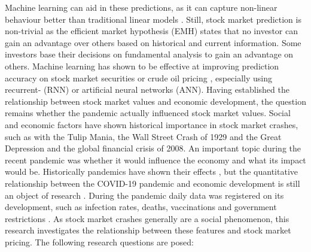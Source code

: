 Machine learning can aid in these predictions, as it can capture non-linear behaviour better than traditional linear models \cite{zhang2009stock}. Still, stock market prediction is non-trivial as the efficient market hypothesis (EMH) \cite{peters1996chaos} states that no investor can gain an advantage over others based on historical and current information. Some investors base their decisions on fundamental analysis \cite{lev1993fundamental} to gain an advantage on others. Machine learning has shown to be effective at improving prediction accuracy on stock market securities or crude oil pricing \cite{jain1996, YU20082623, zhang2009stock, thawornwong2004forecasting}, especially using recurrent- (RNN) or artificial neural networks (ANN). %
Having established the relationship between stock market values and economic development, the question remains whether the pandemic actually influenced stock market values. Social and economic factors have shown historical importance in stock market crashes, such as with the Tulip Mania, the Wall Street Crash of 1929 and the Great Depression \cite{white1990, kindleberger1986world} and the global financial crisis of 2008. An important topic during the recent pandemic was whether it would influence the economy and what its impact would be. Historically pandemics have shown their effects \cite{osterholm2017preparing, correia1918pandemics, jorda2020longer}, but the quantitative relationship between the COVID-19 pandemic and economic development is still an object of research \cite{chudik2020economic, baldwin2020economics, fernandes2020economic, deb2020economic}. During the pandemic daily data was registered on its development, such as infection rates, deaths, vaccinations and government restrictions \cite{dong2020interactive, hale2020variation}. As stock market crashes generally are a social phenomenon, this research investigates the relationship between these features and stock market pricing. The following research questions are posed:
